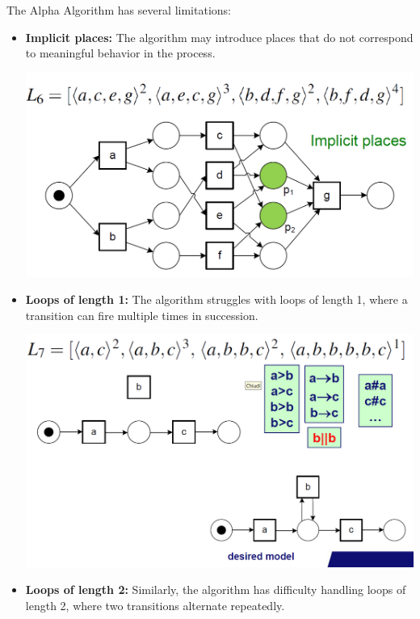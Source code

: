     The Alpha Algorithm has several limitations:
    \begin{itemize}
        \item \textbf{Implicit places:} The algorithm may introduce places that do not correspond to meaningful behavior in the process. 
        \begin{center}
            \includegraphics[width=\textwidth]{capitolo 5/5 limit 1 .png}
        \end{center}
        \item \textbf{Loops of length 1:} The algorithm struggles with loops of length 1, where a transition can fire multiple times in succession.
        \begin{center}
            \includegraphics[width=\textwidth]{capitolo 5/5 limit 2.png}
        \end{center}
        \item \textbf{Loops of length 2:} Similarly, the algorithm has difficulty handling loops of length 2, where two transitions alternate repeatedly.
        \begin{center}

\end{center}
\end{itemize}
